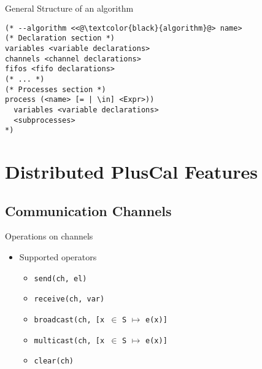 \documentclass{beamer}
\begin{document}
\begin{frame}[fragile]{General Structure of an algorithm}
\begin{lstlisting}[language=pluscal, frame = tlrb, numbers = none]
(* --algorithm <<@\textcolor{black}{algorithm}@> name>
(* Declaration section *)
variables <variable declarations>
channels <channel declarations>
fifos <fifo declarations>
(* ... *)
(* Processes section *)
process (<name> [= | \in] <Expr>))
  variables <variable declarations>
  <subprocesses>
*)
\end{lstlisting}
\end{frame}

\section{Distributed PlusCal Features}

\subsection{Communication Channels}

\begin{frame}[fragile]{Operations on channels}
    \begin{itemize}
     \item Supported operators 
        \begin{itemize}
        \item \verb|send(ch, el)|
        \item \verb|receive(ch, var)|
        \item \verb|broadcast(ch, [x |$\in$ \verb|S| $\mapsto$ \verb|e(x)]|
        \item \verb|multicast(ch, [x |$\in$ \verb|S| $\mapsto$ \verb|e(x)]|
        \item \verb|clear(ch)|
    \end{itemize}
    \end{itemize}
\end{frame}
\end{document}
